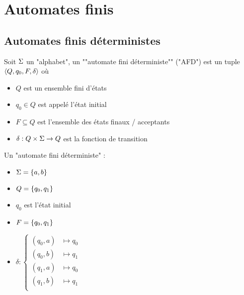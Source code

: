 
\section{Automates finis}

\subsection{Automates finis déterministes}

\begin{definition}
	Soit $\Sigma$ un "alphabet", un ""automate fini déterministe"" ("AFD") est un tuple $\langle Q, q_0, F, \delta \rangle$ où
	\begin{itemize}
		\item $Q$ est un ensemble fini d'états
		\item $q_0 \in Q$ est appelé l'état initial
		\item $F \subseteq Q$ est l'ensemble des états finaux / acceptants
		\item $\delta : Q \times \Sigma \to Q$ est la fonction de transition
	\end{itemize}
\end{definition}


\begin{exemple} Un "automate fini déterministe" :

	\vspace{0.5cm}
	\begin{minipage}{0.5\textwidth}
		\begin{itemize}
			\item $\Sigma = \left\{a, b\right\}$
			\item $Q = \left\{q_0, q_1\right\}$
			\item $q_0$ est l'état initial
			\item $F = \left\{q_0, q_1\right\}$
			\item $\delta :
				      \left\{
				      \begin{array}{cc}
					      (q_0, a) & \mapsto q_0 \\
					      (q_0, b) & \mapsto q_1 \\
					      (q_1, a) & \mapsto q_0 \\
					      (q_1, b) & \mapsto q_1 \\
				      \end{array}
				      \right.$
		\end{itemize}
	\end{minipage}
	\begin{minipage}{0.5\textwidth}
		\begin{automata}
		\end{automata}
	\end{minipage}
\end{exemple}

